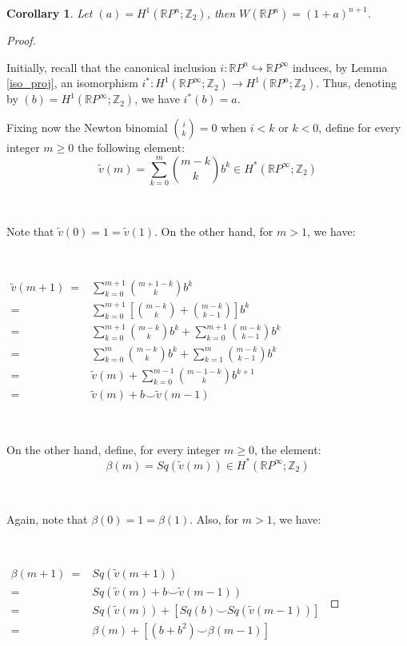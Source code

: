 \documentclass[12pt,oneside]{book}
\newtheorem{cor}    {Corollary}[chapter]
\newcommand{\RP}{\mathbb{R}P}
\newcommand{\Z}{\mathbb{Z}}
\newcommand{\ccup}{\smile}
\newcommand{\wt}{\widetilde}
\begin{document}
    \begin{cor}\label{ap_wu_7}
    	Let $(a)=H^{1}(\RP^{n};\Z_{2})$, then $W(\RP^{n})=(1+a)^{n+1}$.
    \end{cor}

    \begin{proof}

        \

        Initially, recall that the canonical inclusion $i:\RP^{n}\hookrightarrow\RP^{\infty}$ induces, by Lemma \ref{iso_proj}, an 
        isomorphism $i^{*}:H^{1}(\RP^{\infty};\Z_{2})\to H^{1}(\RP^{n};\Z_{2})$. Thus, denoting by $(b)=H^{1}(\RP^{\infty};\Z_{2})$, we have 
        $i^{*}(b)=a$.

        Fixing now the Newton binomial $\binom{i}{k}=0$ when $i<k$ or $k<0$, define for every integer $m\geq 0$ the 
        following element:
        $$ \wt{v}(m)=\sum_{k=0}^{m}\binom{m-k}{k}b^{k}\in H^{*}(\RP^{\infty};\Z_{2}) $$

        \

        Note that $\wt{v}(0)=1=\wt{v}(1)$. On the other hand, for $m>1$, we have:

        \

        $ \begin{array}{rl}
        	\wt{v}(m+1) \ = & \sum_{k=0}^{m+1}\binom{m+1-k}{k}b^{k} \\
        	= & \sum_{k=0}^{m+1}\left[ \binom{m-k}{k}+\binom{m-k}{k-1} \right]b^{k} \\
        	= & \sum_{k=0}^{m+1}\binom{m-k}{k}b^{k}+\sum_{k=0}^{m+1}\binom{m-k}{k-1}b^{k} \\
        	= & \sum_{k=0}^{m}\binom{m-k}{k}b^{k}+\sum_{k=1}^{m}\binom{m-k}{k-1}b^{k} \\
        	= & \wt{v}(m)+\sum_{k=0}^{m-1}\binom{m-1-k}{k}b^{k+1} \\
        	= & \wt{v}(m)+b\ccup \wt{v}(m-1)
        \end{array} $

        \

        On the other hand, define, for every integer $m\geq 0$, the element:
        $$ \beta(m)=Sq(\wt{v}(m))\in H^{*}(\RP^{\infty};\Z_{2}) $$

        \

        Again, note that $\beta(0)=1=\beta(1)$. Also, for $m>1$, we have:

        \

        $ \begin{array}{rl}
        	\beta(m+1) \ = & Sq(\wt{v}(m+1)) \\
        	= & Sq(\wt{v}(m)+b\ccup\wt{v}(m-1)) \\
        	= & Sq(\wt{v}(m))+\left[ Sq(b)\ccup Sq(\wt{v}(m-1)) \right] \\
        	= & \beta(m)+\left[ (b+b^{2})\ccup\beta(m-1) \right]
        \end{array} $


\end{proof}
\end{document}
